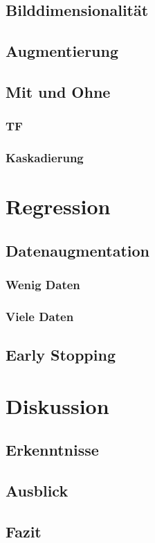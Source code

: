 \documentclass[ngerman]{report}
\begin{document}
    \section{Bilddimensionalität}
    \section{Augmentierung}
    \section{Mit und Ohne}
    \subsection{TF}
    \subsection{Kaskadierung}


    \chapter{Regression}  %
    \section{Datenaugmentation}
    \subsection{Wenig Daten}
    \subsection{Viele Daten}
    \section{Early Stopping}
    
    \chapter{Diskussion}  %
    \section{Erkenntnisse}
    
    \section{Ausblick}
    \section{Fazit}

    \printbibliography
\end{document}
